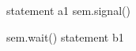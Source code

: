 \documentclass[varwidth=28em,crop]{standalone}
\begin{document}
\begin{minipage}{.27\linewidth}
\vspace{1em}
\begin{ccode}
statement a1
sem.signal()      
\end{ccode}
\end{minipage}\qquad
\begin{minipage}{.27\linewidth}
\vspace{1em}
\begin{ccode}
sem.wait()
statement b1      
\end{ccode}  
\end{minipage}
\end{document}
